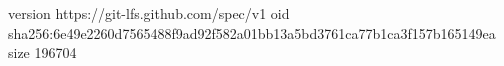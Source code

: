 version https://git-lfs.github.com/spec/v1
oid sha256:6e49e2260d7565488f9ad92f582a01bb13a5bd3761ca77b1ca3f157b165149ea
size 196704
